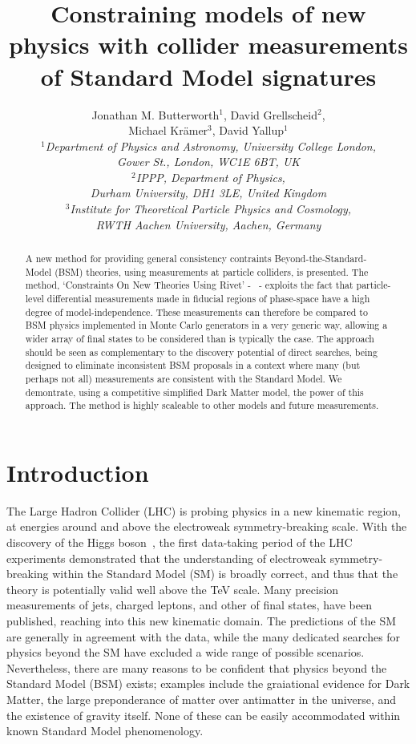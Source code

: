 \documentclass[floatfix]{article}
\title{Constraining models of new physics with collider measurements of Standard Model signatures}
\author{Jonathan M. Butterworth$^1$, David Grellscheid$^2$,\\ Michael Kr\"amer$^3$, David Yallup$^1$\\
\it $^1$Department of Physics and Astronomy, University College London,\\ \it Gower St., London, WC1E 6BT, UK\\
\it $^2$IPPP, Department of Physics,\\\it Durham University, DH1 3LE, United Kingdom\\ \it $^3$Institute for Theoretical Particle Physics and Cosmology, \\ \it RWTH Aachen University, Aachen, Germany}
\begin{document}
\maketitle 

\begin{abstract}
A new method for providing general consistency contraints Beyond-the-Standard-Model (BSM) theories, using 
measurements at particle colliders, is presented. The method, `Constraints On New Theories Using Rivet' - \Contur \ - exploits
the fact that particle-level differential measurements made in fiducial regions of phase-space have a high degree of
model-independence. These measurements can therefore be compared to BSM physics implemented in Monte Carlo generators in a very
generic way, allowing a wider array of final states to be considered than is typically the case. The \Contur approach should be seen
as complementary to the discovery potential of direct searches, being designed to eliminate inconsistent 
BSM proposals in a context where many (but perhaps not all) measurements are consistent with the Standard Model.
We demontrate, using a competitive simplified Dark Matter model, the power of this approach. 
The \Contur method is highly scaleable to other models and future measurements.
\end{abstract}


\section{Introduction}
\label{sec:intro}

The Large Hadron Collider (LHC) is probing physics in a new kinematic region, at energies around and above the 
electroweak symmetry-breaking scale. With the discovery of the Higgs boson~\cite{Aad:2012tfa,Chatrchyan:2012ufa}, 
the first data-taking period of the LHC experiments demonstrated that the understanding of electroweak symmetry-breaking within
the Standard Model (SM) is broadly correct, and thus that the theory is potentially valid well above the
TeV scale. Many precision measurements of jets, charged leptons, and other of final states, 
have been published, reaching into this new kinematic domain. The predictions of the SM are 
generally in agreement with the data, while the many dedicated searches for physics beyond the SM
have excluded a wide range of possible scenarios. Nevertheless, there are many reasons to be confident that
physics beyond the Standard Model (BSM) exists; examples include the graiational evidence for Dark Matter, the large 
preponderance of matter over antimatter in the universe, and the existence of gravity itself. None of 
these can be easily accommodated within known Standard Model phenomenology. 
\end{document}
